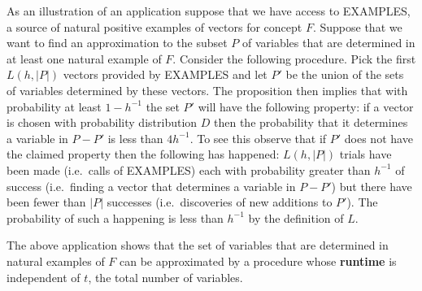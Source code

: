 As an illustration of an application suppose that we have access to EXAMPLES, a source of
natural positive examples of vectors for concept $F$. Suppose that we want to find an approximation
to the subset $P$ of variables that are determined in at least one natural example of $F$. Consider
the following procedure. Pick the first $L(h, |P|)$ vectors provided by EXAMPLES and let $P'$ be the
union of the sets of variables determined by these vectors. The proposition then implies that with
probability at least $1 - h^{-1}$ the set $P'$ will have the following property: if a vector is
chosen with probability distribution $D$ then the probability that it determines a variable in
$P - P'$ is less than $4h^{-1}$. To see this observe that if $P'$ does not have the claimed property then the
following has happened: $L(h, |P|)$ trials have been made (i.e.\ calls of EXAMPLES) each with probability
greater than $h^{-1}$ of success (i.e.\ finding a vector that determines a variable in $P - P'$) but
there have been fewer than $|P|$ successes (i.e.\ discoveries of new additions to $P'$). The probability of such a happening is less than $h^{-1}$ by the definition of $L$.

The above application shows that the set of variables that are determined in natural examples
of $F$ can be approximated by a procedure whose \textbf{runtime} is independent of $t$, the total number of
variables.
